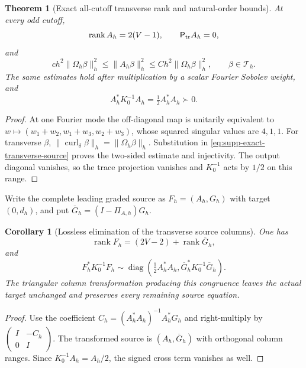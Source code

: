\documentclass[11pt]{article}
\newtheorem{theorem}{Theorem}[section]
\numberwithin{equation}{section}
\newtheorem{corollary}[corollary]{Corollary}
\theoremstyle{definition}
\theoremstyle{remark}
\newcommand{\rank}{\operatorname{rank}}
\begin{document}
\begin{theorem}[Exact all-cutoff transverse rank and natural-order bounds]
\label{thm:supp-exact-transverse}
At every odd cutoff,
\begin{equation}
 \rank A_h=2(V-1),\qquad \mathsf P_{\rm tr}A_h=0,
 \label{eq:supp-exact-transverse-rank}
\end{equation}
and
\begin{equation}
 c h^2\|\Omega_h\beta\|_h^2
 \le\|A_h\beta\|_h^2
 \le C h^2\|\Omega_h\beta\|_h^2,
 \qquad \beta\in\mathcal T_h.
 \label{eq:supp-exact-transverse-bounds}
\end{equation}
The same estimates hold after multiplication by a scalar Fourier Sobolev
weight, and
\begin{equation}
 A_h^*K_0^{-1}A_h=\tfrac12A_h^*A_h\succ0.
 \label{eq:supp-exact-transverse-positive}
\end{equation}
\end{theorem}
\begin{proof}
At one Fourier mode the off-diagonal map is unitarily equivalent to
$w\mapsto(w_1+w_2,w_1+w_3,w_2+w_3)$, whose squared singular values are
$4,1,1$.  For transverse $\beta$,
$\|\operatorname{curl}_\delta\beta\|_h=\|\Omega_h\beta\|_h$.
Substitution in \eqref{eq:supp-exact-transverse-source} proves the two-sided
estimate and injectivity.  The output diagonal vanishes, so the trace
projection vanishes and $K_0^{-1}$ acts by $1/2$ on this range.
\end{proof}

Write the complete leading graded source as $F_h=(A_h,G_h)$ with target
$(0,d_h)$, and put $\overline G_h=(I-\Pi_{A,h})G_h$.

\begin{corollary}[Lossless elimination of the transverse source columns]
\label{cor:supp-exact-transverse-elimination}
One has
\begin{equation}
 \rank F_h=(2V-2)+\rank\overline G_h,
 \label{eq:supp-exact-rank-split}
\end{equation}
and
\begin{equation}
 F_h^*K_0^{-1}F_h\sim
 \operatorname{diag}\left(\tfrac12A_h^*A_h,
          \overline G_h^*K_0^{-1}\overline G_h\right).
 \label{eq:supp-exact-Gram-split}
\end{equation}
The triangular column transformation producing this congruence leaves the
actual target unchanged and preserves every remaining source equation.
\end{corollary}
\begin{proof}
Use the coefficient
$C_h=(A_h^*A_h)^{-1}A_h^*G_h$ and right-multiply by
$\left(\begin{smallmatrix}I&-C_h\\0&I\end{smallmatrix}\right)$.
The transformed source is $(A_h,\overline G_h)$ with orthogonal column
ranges.  Since $K_0^{-1}A_h=A_h/2$, the signed cross term vanishes as well.
\end{proof}
\end{document}
